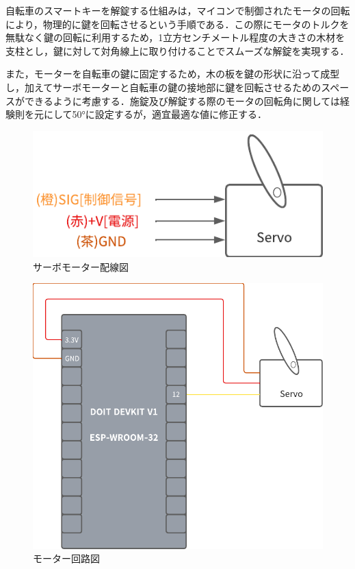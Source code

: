            \par 自転車のスマートキーを解錠する仕組みは，マイコンで制御されたモータの回転により，物理的に鍵を回転させるという手順である．この際にモータのトルクを無駄なく鍵の回転に利用するため，1立方センチメートル程度の大きさの木材を支柱とし，鍵に対して対角線上に取り付けることでスムーズな解錠を実現する．
           \par また，モーターを自転車の鍵に固定するため，木の板を鍵の形状に沿って成型し，加えてサーボモーターと自転車の鍵の接地部に鍵を回転させるためのスペースができるように考慮する．施錠及び解錠する際のモータの回転角に関しては経験則を元にして50°に設定するが，適宜最適な値に修正する．

          \begin{figure}[htbp]
            \centering
            \includegraphics[scale=1.96]
            {figures/ServoMotorWritingDiagram.png}
            \caption{サーボモーター配線図}
            \label{fig:サーボモーター配線図}
          \end{figure}

          \begin{figure}[htbp]
            \centering
            \includegraphics[scale=1.26]
            {figures/MotorCircuitDiagram.png}
            \caption{モーター回路図}
            \label{fig:モーター回路図}
          \end{figure}
      
